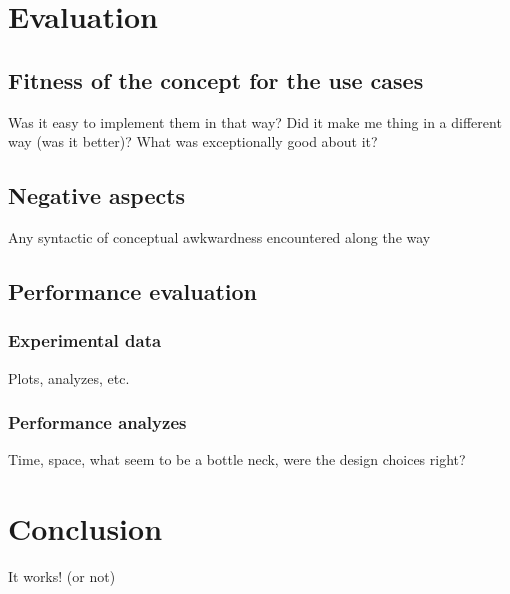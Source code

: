 \documentclass[12pt,twoside,notitlepage]{report}
\begin{document}
\cleardoublepage
\chapter{Evaluation}

\section{Fitness of the concept for the use cases}
Was it easy to implement them in that way? Did it make me thing in a different way (was it better)? What was exceptionally good about it?

\section{Negative aspects}
Any syntactic of conceptual awkwardness encountered along the way

\section{Performance evaluation}
\subsection{Experimental data}
Plots, analyzes, etc.

\subsection{Performance analyzes}
Time, space, what seem to be a bottle neck, were the design choices right? 




\cleardoublepage
\chapter{Conclusion}

It works! (or not)




\cleardoublepage



\cleardoublepage
\end{document}
